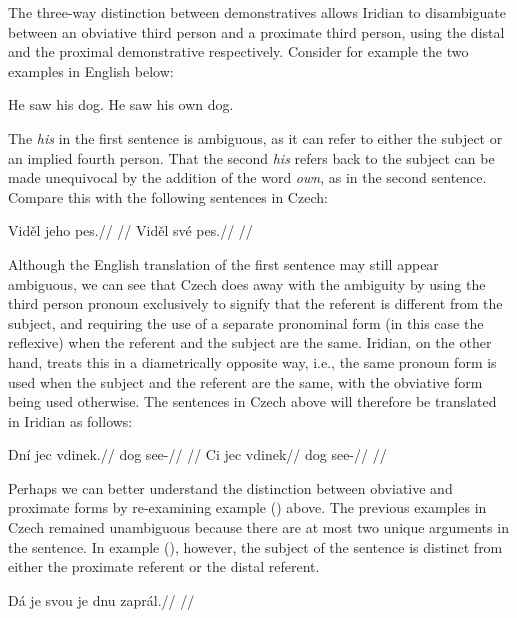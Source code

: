 The three-way distinction between demonstratives allows Iridian to disambiguate between an obviative third person and a proximate third person, using the distal and the proximal demonstrative respectively. Consider for example the two examples in English below:

\pex
\a He saw his dog.
\a He saw his own dog.\smallskip
\xe

The \emph{his} in the first sentence is ambiguous, as it can refer to either the subject or an implied fourth person. That the second \emph{his} refers back to the subject can be made unequivocal by the addition of the word \emph{own}, as in the second sentence. Compare this with the following sentences in Czech:

\pex
\a
\begingl
\gla Vid\v{e}l jeho pes.//
\glft {}//
\endgl
\a \begingl
\gla Vid\v{e}l sv\'e pes.//
\glft {}//
\endgl
\xe

Although the English translation of the first sentence may still appear ambiguous, we can see that Czech does away with the ambiguity by using the third person pronoun  exclusively to signify that the referent is different from the subject, and requiring the use of a separate pronominal form (in this case the reflexive) when the referent and the subject are the same. Iridian, on the other hand, treats this in a diametrically opposite way, i.e., the same pronoun form is used when the subject and the referent are the same, with the obviative form being used otherwise. The sentences in Czech above will therefore be translated in Iridian as follows:

\pex
\a
\begingl
\gla Dn\'i jec vdinek.//
\glb {} dog see-//
\glft {}//
\endgl
\a \begingl
\gla Ci jec vdinek//
\glb {} dog see-//
\glft {}//
\endgl
\xe

Perhaps we can better understand the distinction between obviative and proximate forms by re-examining example () above. The previous examples in Czech remained unambiguous because there are at most two unique arguments in the sentence. In example (), however, the subject of the sentence is distinct from either the proximate referent or the distal referent.

\ex[exno={\getfullref{obv.obv1}}]
\begingl
\gla D\'a je svou je dnu zapr\'al.//
\glft {}//
\endgl
\xe

